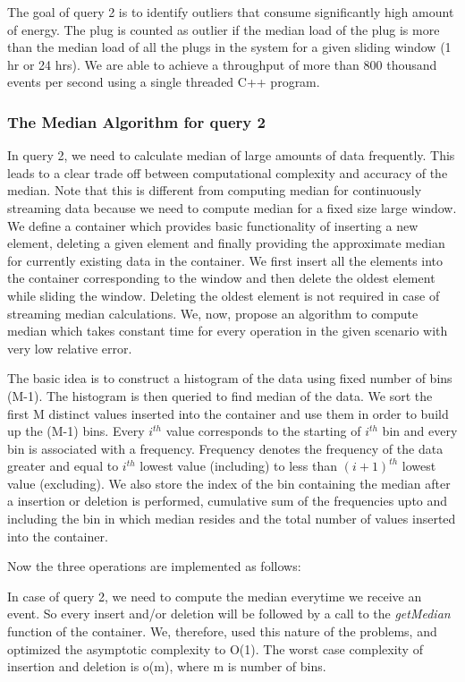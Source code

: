 
The goal of query 2 is to identify outliers that consume significantly high amount of energy. The plug is counted as outlier if the median load of the plug is more than the median load of all the plugs in the system for a given sliding window (1 hr or 24 hrs). We are able to achieve a throughput of more than 800 thousand events per second using a single threaded C++ program.

\subsubsection{The Median Algorithm for query 2}
In query 2, we need to calculate median of large amounts of data frequently. This leads to a clear trade off between computational complexity and accuracy of the median. Note that this is different from computing median for continuously streaming data because we need to compute median for a fixed size large window. We define a container which provides basic functionality of inserting a new element, deleting a given element and finally providing the approximate median for currently existing data in the container. We first insert all the elements into the container corresponding to the window and then delete the oldest element while sliding the window. Deleting the oldest element is not required in case of streaming median calculations. We, now, propose an algorithm to compute median which takes constant time for every operation in the given scenario with very low relative error.

The basic idea is to construct a histogram of the data using fixed number of bins (M-1). The histogram is then queried to find median of the data. We sort the first M distinct values inserted into the container and use them in order to build up the (M-1) bins. Every $i^{th}$ value corresponds to the starting of $i^{th}$ bin and every bin is associated with a frequency. Frequency denotes the frequency of the data greater and equal to $i^{th}$ lowest value (including) to less than $(i+1)^{th}$ lowest value (excluding). We also store the index of the bin containing the median after a insertion or deletion is performed, cumulative sum of the frequencies upto and including the bin in which median resides and the total number of values inserted into the container.



Now the three operations are implemented as follows:

In case of query 2, we need to compute the median everytime we receive an event. So every insert and/or deletion will be followed by a call to the \textit{getMedian} function of the container. We, therefore, used this nature of the problems, and optimized the asymptotic complexity to O(1). The worst case complexity of insertion and deletion is o(m), where m is number of bins.


